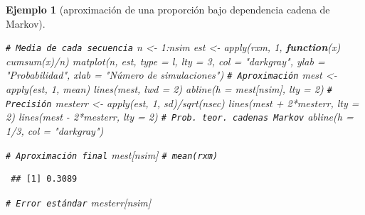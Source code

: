 \documentclass[
  10pt,
]{book}
\newenvironment{Shaded}{\begin{snugshade}}{\end{snugshade}}
\newcommand{\AttributeTok}[1]{\textcolor[rgb]{0.77,0.63,0.00}{#1}}
\newcommand{\CommentTok}[1]{\textcolor[rgb]{0.56,0.35,0.01}{\textit{#1}}}
\newcommand{\ControlFlowTok}[1]{\textcolor[rgb]{0.13,0.29,0.53}{\textbf{#1}}}
\newcommand{\DecValTok}[1]{\textcolor[rgb]{0.00,0.00,0.81}{#1}}
\newcommand{\FunctionTok}[1]{\textcolor[rgb]{0.00,0.00,0.00}{#1}}
\newcommand{\NormalTok}[1]{#1}
\newcommand{\OtherTok}[1]{\textcolor[rgb]{0.56,0.35,0.01}{#1}}
\newcommand{\SpecialCharTok}[1]{\textcolor[rgb]{0.00,0.00,0.00}{#1}}
\newcommand{\StringTok}[1]{\textcolor[rgb]{0.31,0.60,0.02}{#1}}
\theoremstyle{break}
\newtheorem{example}{Ejemplo}[chapter]
\theoremstyle{nonumberplain}
\renewcommand{\CommentTok}[1]{\textcolor[rgb]{0.41,0.41,0.41}{\texttt{#1}}}
\begin{document}
\begin{example}[aproximación de una proporción bajo dependencia cadena de Markov]
\begin{Shaded}
\begin{Highlighting}[]
\CommentTok{\# Media de cada secuencia}
\NormalTok{n }\OtherTok{\textless{}{-}} \DecValTok{1}\SpecialCharTok{:}\NormalTok{nsim}
\NormalTok{est }\OtherTok{\textless{}{-}} \FunctionTok{apply}\NormalTok{(rxm, }\DecValTok{1}\NormalTok{, }\ControlFlowTok{function}\NormalTok{(x) }\FunctionTok{cumsum}\NormalTok{(x)}\SpecialCharTok{/}\NormalTok{n)}
\FunctionTok{matplot}\NormalTok{(n, est, }\AttributeTok{type =} \StringTok{\textquotesingle{}l\textquotesingle{}}\NormalTok{, }\AttributeTok{lty =} \DecValTok{3}\NormalTok{, }\AttributeTok{col =} \StringTok{"darkgray"}\NormalTok{,}
        \AttributeTok{ylab =} \StringTok{"Probabilidad"}\NormalTok{, }\AttributeTok{xlab =} \StringTok{"Número de simulaciones"}\NormalTok{)}
\CommentTok{\# Aproximación}
\NormalTok{mest }\OtherTok{\textless{}{-}} \FunctionTok{apply}\NormalTok{(est, }\DecValTok{1}\NormalTok{, mean)}
\FunctionTok{lines}\NormalTok{(mest, }\AttributeTok{lwd =} \DecValTok{2}\NormalTok{)}
\FunctionTok{abline}\NormalTok{(}\AttributeTok{h =}\NormalTok{ mest[nsim], }\AttributeTok{lty =} \DecValTok{2}\NormalTok{)}
\CommentTok{\# Precisión}
\NormalTok{mesterr }\OtherTok{\textless{}{-}} \FunctionTok{apply}\NormalTok{(est, }\DecValTok{1}\NormalTok{, sd)}\SpecialCharTok{/}\FunctionTok{sqrt}\NormalTok{(nsec)}
\FunctionTok{lines}\NormalTok{(mest }\SpecialCharTok{+} \DecValTok{2}\SpecialCharTok{*}\NormalTok{mesterr, }\AttributeTok{lty =} \DecValTok{2}\NormalTok{)}
\FunctionTok{lines}\NormalTok{(mest }\SpecialCharTok{{-}} \DecValTok{2}\SpecialCharTok{*}\NormalTok{mesterr, }\AttributeTok{lty =} \DecValTok{2}\NormalTok{)}
\CommentTok{\# Prob. teor. cadenas Markov}
\FunctionTok{abline}\NormalTok{(}\AttributeTok{h =} \DecValTok{1}\SpecialCharTok{/}\DecValTok{3}\NormalTok{, }\AttributeTok{col =} \StringTok{"darkgray"}\NormalTok{)     }

\CommentTok{\# Aproximación final}
\NormalTok{mest[nsim] }\CommentTok{\# mean(rxm)}
\end{Highlighting}
\end{Shaded}

\begin{verbatim}
 ## [1] 0.3089
\end{verbatim}

\begin{Shaded}
\begin{Highlighting}[]
\CommentTok{\# Error estándar}
\NormalTok{mesterr[nsim]}
\end{Highlighting}
\end{Shaded}


\end{example}
\end{document}
